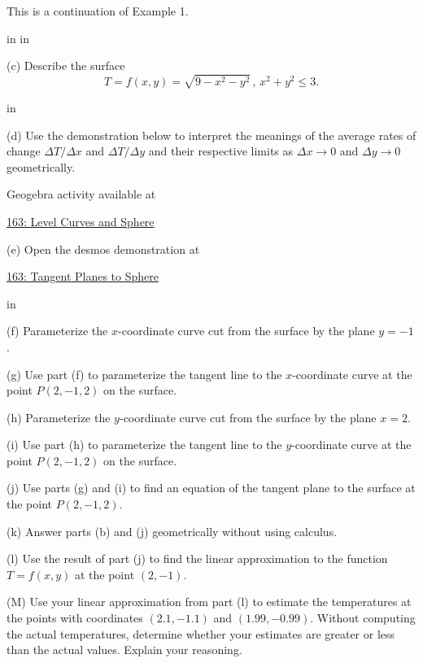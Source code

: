 \documentclass{ximera}
\newcommand{\pskip}{\vskip 0.1 in}
\begin{document}
\begin{example}  \label{Esdtr435r}
This is a continuation of Example 1. 

\pskip \pskip

(c) Describe the surface
\[
  T = f(x,y) = \sqrt{9-x^2-y^2} \, , \, x^2 + y^2 \leq 3 .
\]

\pskip

(d) Use the demonstration below to interpret the meanings of the average rates of change $\Delta T/\Delta x$ and $\Delta T/\Delta y$ and their respective limits as $\Delta x\to 0$ and $\Delta y\to 0$ geometrically.

 
\begin{onlineOnly}
    \begin{center}
\end{center}
\end{onlineOnly}

Geogebra activity available at

\href{https://www.geogebra.org/classic/egnkjkqw}{163: Level Curves and Sphere}




(e) Open the desmos demonstration at

\href{https://www.desmos.com/3d/967c10cbdc}{163: Tangent Planes to Sphere}

\pskip

(f) Parameterize the $x$-coordinate curve cut from the surface by the plane $y=-1$.

(g) Use part (f) to parameterize the tangent line to the $x$-coordinate curve at the point $P(2,-1,2)$ on the surface.

(h) Parameterize the $y$-coordinate curve cut from the surface by the plane $x=2$.

(i) Use part (h) to parameterize the tangent line to the $y$-coordinate curve at the point $P(2,-1,2)$ on the surface.

(j) Use parts (g) and (i) to find an equation of the tangent plane to the surface at the point $P(2,-1,2)$.

(k) Answer parts (b) and (j) geometrically without using calculus.

(l) Use the result of part (j) to find the linear approximation to the function $T=f(x,y)$ at the point $(2,-1)$.

(M) Use your linear approximation from part (l) to estimate the temperatures at the points with coordinates $(2.1, -1.1)$ and $(1.99, -0.99)$. Without computing the actual temperatures, determine whether your estimates are greater or less than the actual values. Explain your reasoning.

\end{example}
\end{document}
